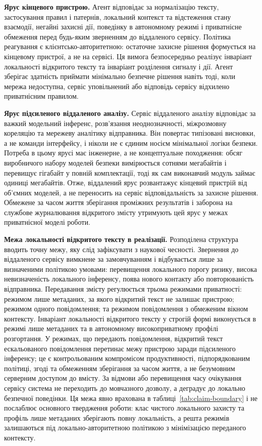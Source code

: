 \textbf{Ярус кінцевого пристрою.} Агент відповідає за нормалізацію тексту, застосування правил і патернів, локальний контекст та відстеження стану взаємодії, негайні захисні дії, поведінку в автономному режимі і приватнісне обмеження перед будь-яким зверненням до віддаленого сервісу. Політика реагування є клієнтсько-авторитетною: остаточне захисне рішення формується на кінцевому пристрої, а не на сервісі. Ця вимога безпосередньо реалізує інваріант локальності відкритого тексту та інваріант розділення сигналу і дії. Агент зберігає здатність приймати мінімально безпечне рішення навіть тоді, коли мережа недоступна, сервіс уповільнений або відповідь сервісу відхилено приватнісним правилом.

\textbf{Ярус підсиленого віддаленого аналізу.} Сервіс віддаленого аналізу відповідає за важкий модельний інференс, розв'язання неоднозначності, міжрозмовну кореляцію та мережеву аналітику відправника. Він повертає типізовані висновки, а не команди інтерфейсу, і ніколи не є єдиним носієм мінімальної логіки безпеки. Потреба в цьому ярусі має інженерне, а не концептуальне походження: обсяг виробничого набору моделей безпеки вимірюється сотнями мегабайтів і перевищує гігабайт у повній комплектації, тоді як сам виконавчий модуль займає одиниці мегабайтів. Отже, віддалений ярус розвантажує кінцевий пристрій від об'ємних моделей, а не переносить на сервіс відповідальність за захисне рішення. Обмежене за часом життя зберігання проміжних результатів і заборона на службове журналювання відкритого змісту утримують цей ярус у межах приватнісної моделі роботи.

\textbf{Межа локальності відкритого тексту в реалізації.} Розподілена структура вводить точну межу, яку слід зафіксувати з наукової чесності. Звернення до віддаленого сервісу вимкнене за замовчуванням і відбувається лише за визначеними політикою умовами: перевищення локального порогу ризику, висока невизначеність локального інференсу, поява нового контакту або повторюваність відправника. Передавання змісту регулюється трьома режимами приватності: режимом лише метаданих, за якого відкритий текст не залишає пристрою; режимом одного повідомлення; та режимом повідомлення з обмеженим вікном контексту. Інваріант локальності відкритого тексту у строгій формі виконується в режимі лише метаданих та в автономному високоприватному профілі розгортання. У режимах, що передають повідомлення, відкритий текст ескальованого повідомлення перетинає межу пристрою заради підсиленого інференсу; це є контрольованим компромісом продуктивності, підпорядкованим політиці, згоді та обмеженням зберігання за часом життя, а не безумовним серверним доступом до вмісту. За відмови або перевищення часу очікування сервісу система не переходить до мовчазного дозволу, а деградує до локально безпечної поведінки. Ця межа явно врахована в таблиці~\ref{tab:claim-boundary} і не послаблює основного твердження роботи: клас чистого локального захисту та профіль лише метаданих зберігають повну локальність, а решта режимів залишаються під локально-авторитетною політикою з мінімізацією переданого контексту.

